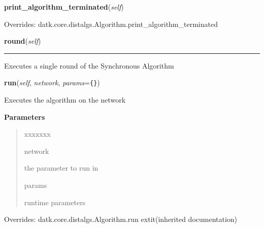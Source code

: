     \vspace{0.5ex}

\hspace{.8\funcindent}\begin{boxedminipage}{\funcwidth}

    \raggedright \textbf{print\_algorithm\_terminated}(\textit{self})

\setlength{\parskip}{2ex}
\setlength{\parskip}{1ex}
      Overrides: datk.core.distalgs.Algorithm.print\_algorithm\_terminated

    \end{boxedminipage}

    \label{datk:core:distalgs:Synchronous_Algorithm:round}

    \vspace{0.5ex}

\hspace{.8\funcindent}\begin{boxedminipage}{\funcwidth}

    \raggedright \textbf{round}(\textit{self})

    \vspace{-1.5ex}

    \rule{\textwidth}{0.5\fboxrule}
\setlength{\parskip}{2ex}
    Executes a single round of the Synchronous Algorithm

\setlength{\parskip}{1ex}
    \end{boxedminipage}

    \vspace{0.5ex}

\hspace{.8\funcindent}\begin{boxedminipage}{\funcwidth}

    \raggedright \textbf{run}(\textit{self}, \textit{network}, \textit{params}={\tt \texttt{\{}\texttt{\}}})

\setlength{\parskip}{2ex}
    Executes the algorithm on the network

\setlength{\parskip}{1ex}
      \textbf{Parameters}
      \vspace{-1ex}

      \begin{quote}
        \begin{Ventry}{xxxxxxx}

          \item[network]

          the parameter to run in

          \item[params]

          runtime parameters

        \end{Ventry}

      \end{quote}

      Overrides: datk.core.distalgs.Algorithm.run 	extit{(inherited documentation)}

    \end{boxedminipage}

